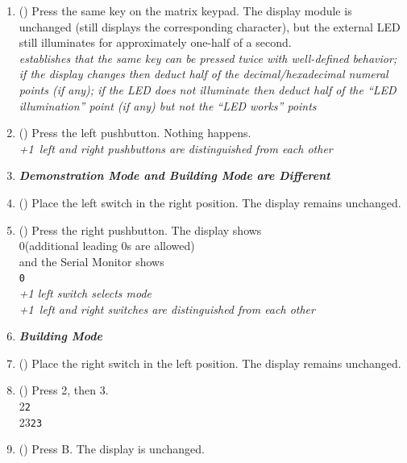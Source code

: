 \begin{enumerate}
{    deduct half of the decimal/hexadecimal numeral points (if any)}
\item (\phantom{xxx}) Press the same key on the matrix keypad. The display
    module is unchanged (still displays the corresponding character), but the
    external LED still illuminates for approximately one-half of a second. \\
    \textit{establishes that the same key can be pressed twice with
    well-defined behavior; if the display changes then deduct half of the
    decimal/hexadecimal numeral points (if any); if the LED does not illuminate
    then deduct half of the ``LED illumination'' point (if any) but not the
    ``LED works'' points}
\item (\phantom{xxx}) Press the left pushbutton. Nothing happens. \\
    \textit{+1\textonehalf\ left and right pushbuttons are distinguished from
    each other}
\item[] \textbf{\textit{Demonstration Mode and Building Mode are Different}}
\item (\phantom{xxx}) Place the left switch in the right position. The display
    remains unchanged.
\item (\phantom{xxx}) Press the right pushbutton. The display shows \\
    {\dviiseg\phantom{0000000}0}\hspace{1cm}(additional leading 0s are allowed)
    \\ and the Serial Monitor shows \\
    {\dviiseg\phantom{00000000}}\hspace{1cm}\texttt{0} \\
    \textit{+1 left switch selects mode} \\
    \textit{+1\textonehalf\ left and right switches are distinguished from
    each other}
\item[] \textbf{\textit{Building Mode}}
\item (\phantom{xxx}) Place the right switch in the left position. The display
    remains unchanged.
\item (\phantom{xxx}) Press 2, then 3. \\
    {\dviiseg \phantom{0000000}2}\hspace{1cm}\texttt{2} \\
    {\dviiseg \phantom{000000}23}\hspace{1cm}\texttt{23}
\item (\phantom{xxx}) Press B. The display is unchanged. \\

\end{enumerate}
